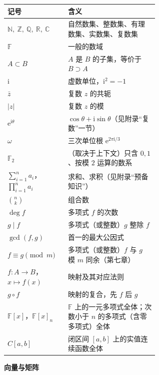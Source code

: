 \begin{center}
	\begin{longtable}{l>{\raggedright\arraybackslash}p{0.6\linewidth}}
		\toprule
		记号 & 含义 \\
		\midrule
		\endhead
		$\mathbb{N},\ \mathbb{Z},\ \mathbb{Q},\ \mathbb{R},\ \mathbb{C}$ & 自然数集、整数集、有理数集、实数集、复数集 \\
		$\mathbb{F}$ & 一般的数域 \\
		$A \subset B$ & $A$ 是 $B$ 的子集，等价于 $B \supset A$ \\
		$\mathrm{i}$ & 虚数单位，$\mathrm i^2=-1$ \\
		$\bar z$ & 复数 $z$ 的共轭 \\
		$|z|$ & 复数 $z$ 的模 \\
		$\mathrm e^{\mathrm i\theta}$ & $\cos\theta+\mathrm i\sin\theta$（见附录“复数”一节） \\
		$\omega$ & 三次单位根 $\mathrm e^{2\pi\mathrm i/3}$ \\
		$\mathbb{F}_2$ & （取决于上下文）只含 $0,1$、按模 $2$ 运算的数系 \\
		$\sum_{i=1}^n a_i$，$\prod_{i=1}^na_i$ & 求和、求积（见附录“预备知识”） \\
		$\binom nk$ & 组合数 \\
		$\deg f$ & 多项式 $f$ 的次数 \\
		$g\mid f$ & 多项式（或整数）$g$ 整除 $f$ \\
		$\gcd(f,g)$ & 首一的最大公因式 \\
		$f\equiv g\pmod m$ & 多项式（或整数）$f$ 与 $g$ 模 $m$ 同余（第七章） \\
		$f:A\to B$，$x\mapsto f(x)$ & 映射及其对应法则 \\
		$g\circ f$ & 映射的复合，先 $f$ 后 $g$ \\
		$\mathbb{F}[x]$，$\mathbb{F}[x]_n$ & $\mathbb{F}$ 上的一元多项式全体；次数小于 $n$ 的多项式（含零多项式）全体 \\
		$C[a,b]$ & 闭区间 $[a,b]$ 上的实值连续函数全体 \\
		\bottomrule
	\end{longtable}
\end{center}
\newpage
\textbf{向量与矩阵}

